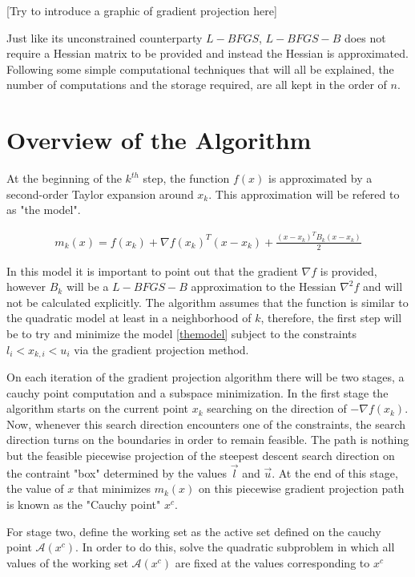 [Try to introduce a graphic of gradient projection here]

Just like its unconstrained counterparty $L-BFGS$, $L-BFGS-B$ does not require a Hessian matrix to be provided and instead the Hessian is approximated. Following some simple computational techniques that will all be explained, the number of computations and the storage required, are all kept in the order of $n$.

\section{Overview of the Algorithm}

At the beginning of the $k^{th}$ step, the function $f(x)$ is approximated by a second-order Taylor expansion around $x_k$. This approximation will be refered to as "the model".

\begin{equation} \label{themodel}
  \begin{aligned}
    m_k(x) = f(x_k) + \nabla f(x_k)^T ( x - x_k) + \frac{(x - x_k)^T B_k (x - x_k) }{2}
  \end{aligned}
\end{equation}

In this model it is important to point out that the gradient $\nabla f$ is provided, however $B_k$ will be a $L-BFGS-B$ approximation to the Hessian $\nabla^2 f$ and will not be calculated explicitly. The algorithm assumes that the function is similar to the quadratic model at least in a neighborhood of $k$, therefore, the first step will be to try and minimize the model \ref{themodel} subject to the constraints $l_i < x_{k, i} < u_i$ via the gradient projection method.

On each iteration of the gradient projection algorithm there will be two stages, a cauchy point computation and a subspace minimization. In the first stage the algorithm starts on the current point $x_k$ searching on the direction of $-\nabla f(x_k)$. Now, whenever this search direction encounters one of the constraints, the search direction turns on the boundaries in order to remain feasible. The path is nothing but the feasible piecewise projection of the steepest descent search direction on the contraint "box" determined by the values $\overrightarrow{l}$ and $\overrightarrow{u}$. At the end of this stage, the value of $x$ that minimizes $m_k(x)$ on this piecewise gradient projection path is known as the "Cauchy point" $x^c$.

For stage two, define the working set as the active set defined on the cauchy point $\mathcal{A}(x^c)$. In order to do this, solve the quadratic subproblem in which all values of the working set $\mathcal{A}(x^c)$ are fixed at the values corresponding to $x^c$

